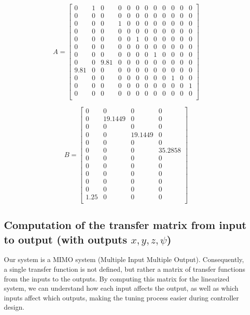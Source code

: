\documentclass[a4paper,12pt]{article}
\begin{document}
\begin{equation}
A =
\begin{bmatrix}
 0 & 1 & 0 & 0 & 0 & 0 & 0 & 0 & 0 & 0 & 0 & 0 \\
0 & 0 & 0 & 0 & 0 & 0 & 0 & 0 & 0 & 0 & 0 & 0 \\
0 & 0 & 0 & 1 & 0 & 0 & 0 & 0 & 0 & 0 & 0 & 0 \\
0 & 0 & 0 & 0 & 0 & 0 & 0 & 0 & 0 & 0 & 0 & 0 \\
0 & 0 & 0 & 0 & 0 & 1 & 0 & 0 & 0 & 0 & 0 & 0 \\
0 & 0 & 0 & 0 & 0 & 0 & 0 & 0 & 0 & 0 & 0 & 0 \\
0 & 0 & 0 & 0 & 0 & 0 & 0 & 1 & 0 & 0 & 0 & 0 \\
0 & 0 & 9.81 & 0 & 0 & 0 & 0 & 0 & 0 & 0 & 0 & 0 \\
9.81 & 0 & 0 & 0 & 0 & 0 & 0 & 0 & 0 & 0 & 0 & 0 \\
0 & 0 & 0 & 0 & 0 & 0 & 0 & 0 & 0 & 1 & 0 & 0 \\
0 & 0 & 0 & 0 & 0 & 0 & 0 & 0 & 0 & 0 & 0 & 1 \\
0 & 0 & 0 & 0 & 0 & 0 & 0 & 0 & 0 & 0 & 0 & 0 \\
\end{bmatrix}
\end{equation}


\begin{equation*}
B =
\begin{bmatrix}
0 & 0 & 0 & 0 \\
0 & 19.1449 & 0 & 0 \\
0 & 0 & 0 & 0 \\
0 & 0 & 19.1449 & 0 \\
0 & 0 & 0 & 0 \\
0 & 0 & 0 & 35.2858 \\
0 & 0 & 0 & 0 \\
0 & 0 & 0 & 0 \\
0 & 0 & 0 & 0 \\
0 & 0 & 0 & 0 \\
0 & 0 & 0 & 0 \\
1.25 & 0 & 0 & 0 \\
\end{bmatrix}
\end{equation*}

\newpage
\subsection{Computation of the transfer matrix from input to output (with outputs $x, y, z, \psi$)}
Our system is a MIMO system (Multiple Input Multiple Output). Consequently, a single transfer function is not defined, but rather a matrix of transfer functions from the inputs to the outputs. By computing this matrix for the linearized system, we can understand how each input affects the output, as well as which inputs affect which outputs, making the tuning process easier during controller design.
\end{document}
